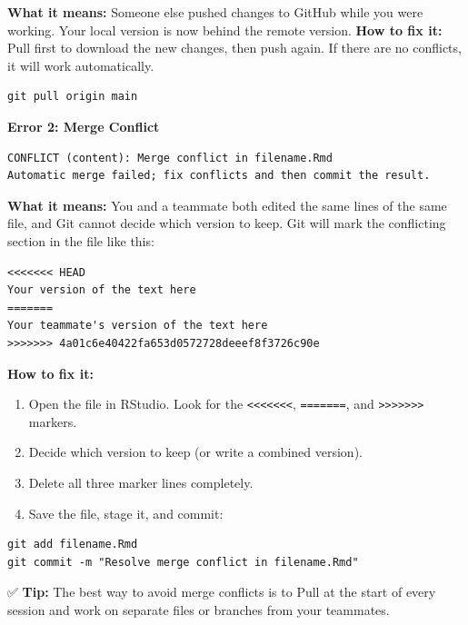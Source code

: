 \documentclass[
]{article}
\providecommand{\tightlist}{%
  \setlength{\itemsep}{0pt}\setlength{\parskip}{0pt}}
\begin{document}
\textbf{What it means:} Someone else pushed changes to GitHub while you
were working. Your local version is now behind the remote version.
\textbf{How to fix it:} Pull first to download the new changes, then
push again. If there are no conflicts, it will work automatically.

\begin{verbatim}
git pull origin main
\end{verbatim}

\textbf{Error 2: Merge Conflict}

\begin{verbatim}
CONFLICT (content): Merge conflict in filename.Rmd
Automatic merge failed; fix conflicts and then commit the result.
\end{verbatim}

\textbf{What it means:} You and a teammate both edited the same lines of
the same file, and Git cannot decide which version to keep. Git will
mark the conflicting section in the file like this:

\begin{verbatim}
<<<<<<< HEAD
Your version of the text here
=======
Your teammate's version of the text here
>>>>>>> 4a01c6e40422fa653d0572728deeef8f3726c90e
\end{verbatim}

\textbf{How to fix it:}

\begin{enumerate}
\def\labelenumi{\arabic{enumi}.}
\tightlist
\item
  Open the file in RStudio. Look for the
  \texttt{\textless{}\textless{}\textless{}\textless{}\textless{}\textless{}\textless{}},
  \texttt{=======}, and
  \texttt{\textgreater{}\textgreater{}\textgreater{}\textgreater{}\textgreater{}\textgreater{}\textgreater{}}
  markers.
\item
  Decide which version to keep (or write a combined version).
\item
  Delete all three marker lines completely.
\item
  Save the file, stage it, and commit:
\end{enumerate}

\begin{verbatim}
git add filename.Rmd
git commit -m "Resolve merge conflict in filename.Rmd"
\end{verbatim}

✅ \textbf{Tip:} The best way to avoid merge conflicts is to Pull at the
start of every session and work on separate files or branches from your
teammates.
\end{document}
